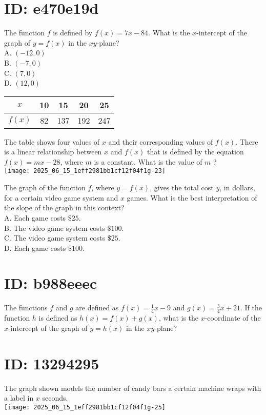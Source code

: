 
\section*{ID: e470e19d}
The function $f$ is defined by $f(x)=7 x-84$. What is the $x$-intercept of the graph of $y=f(x)$ in the $x y$-plane?\\
A. $(-12,0)$\\
B. $(-7,0)$\\
C. $(7,0)$\\
D. $(12,0)$

\begin{center}
\begin{tabular}{|c|c|c|c|c|}
\hline
$x$ & 10 & 15 & 20 & 25 \\
\hline
$f(x)$ & 82 & 137 & 192 & 247 \\
\hline
\end{tabular}
\end{center}

The table shows four values of $x$ and their corresponding values of $f(x)$. There is a linear relationship between $x$ and $f(x)$ that is defined by the equation $f(x)=m x-28$, where $m$ is a constant. What is the value of $m$ ?\\
\texttt{[image: 2025\_06\_15\_1eff2981bb1cf12f04f1g-23]}

The graph of the function $f$, where $y=f(x)$, gives the total cost $y$, in dollars, for a certain video game system and $x$ games. What is the best interpretation of the slope of the graph in this context?\\
A. Each game costs $\$ 25$.\\
B. The video game system costs $\$ 100$.\\
C. The video game system costs $\$ 25$.\\
D. Each game costs $\$ 100$.

\section*{ID: b988eeec}
The functions $f$ and $g$ are defined as $f(x)=\frac{1}{4} x-9$ and $g(x)=\frac{3}{4} x+21$. If the function $h$ is defined as $h(x)=f(x)+g(x)$, what is the $x$-coordinate of the $x$-intercept of the graph of $y=h(x)$ in the $x y$-plane?

\section*{ID: 13294295}
The graph shown models the number of candy bars a certain machine wraps with a label in $x$ seconds.\\
\texttt{[image: 2025\_06\_15\_1eff2981bb1cf12f04f1g-25]}

